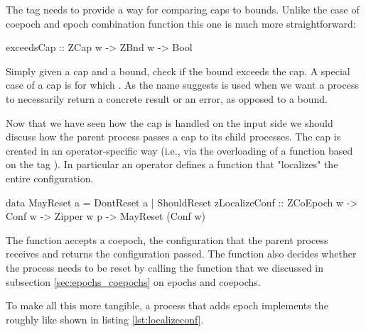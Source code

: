 The  tag needs to provide a way for comparing caps
to bounds. Unlike the case of coepoch and epoch combination function
this one is much more straightforward:

\begin{haskellcode}
exceedsCap :: ZCap w -> ZBnd w -> Bool
\end{haskellcode}

Simply given a cap and a bound, check if the bound exceeds the cap. A
special case of a cap is  for which
. As the name suggests
 is used when we want a process to necessarily
return a concrete result or an error, as opposed to a bound.

Now that we have seen how the cap is handled on the input side we
should discuss how the parent process passes a cap to its child
processes. The cap is created in an operator-specific way (i.e., via the
overloading of a function based on the tag ). In particular an
operator defines a function that "localizes" the entire configuration.

\begin{haskellcode}
data MayReset a = DontReset a | ShouldReset
zLocalizeConf :: ZCoEpoch w -> Conf w -> Zipper w p -> MayReset (Conf w)
\end{haskellcode}

The  function accepts a coepoch, the configuration
that the parent process receives and returns the configuration
passed. The  function also decides whether the
process needs to be reset by calling the 
function that we discussed in subsection \ref{sec:epochs_coepochs} on
epochs and coepochs.

To make all this more tangible, a process that adds epoch implements
the  roughly like shown in listing
\ref{lst:localizeconf}.

